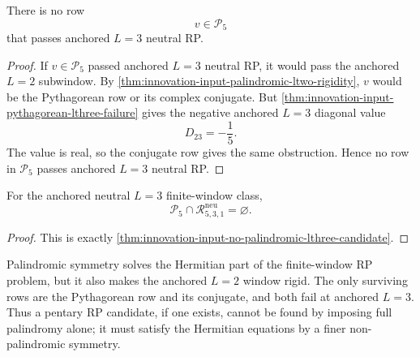 \begin{theorem}[No pentary palindromic anchored $L=3$ candidate]
\label{thm:innovation-input-no-palindromic-lthree-candidate}
There is no row
$$
v\in\mathcal P_5
$$
that passes anchored $L=3$ neutral RP.
\end{theorem}

\begin{proof}
If $v\in\mathcal P_5$ passed anchored $L=3$ neutral RP, it would pass the
anchored $L=2$ subwindow. By
\autoref{thm:innovation-input-palindromic-ltwo-rigidity}, $v$ would be the
Pythagorean row or its complex conjugate. But
\autoref{thm:innovation-input-pythagorean-lthree-failure} gives the
negative anchored $L=3$ diagonal value
$$
D_{23}=-\frac15.
$$
The value is real, so the conjugate row gives the same obstruction. Hence
no row in $\mathcal P_5$ passes anchored $L=3$ neutral RP.
\end{proof}

\begin{corollary}
\label{cor:innovation-input-palindromic-rp-exclusion}
For the anchored neutral $L=3$ finite-window class,
$$
\mathcal P_5\cap\mathcal R_{5,3,1}^{\mathrm{neu}}=\varnothing.
$$
\end{corollary}

\begin{proof}
This is exactly
\autoref{thm:innovation-input-no-palindromic-lthree-candidate}.
\end{proof}

\begin{principle}
\label{prin:innovation-input-palindromic-symmetry-window}
Palindromic symmetry solves the Hermitian part of the finite-window RP
problem, but it also makes the anchored $L=2$ window rigid. The only
surviving rows are the Pythagorean row and its conjugate, and both fail at
anchored $L=3$. Thus a pentary RP candidate, if one exists, cannot be
found by imposing full palindromy alone; it must satisfy the Hermitian
equations by a finer non-palindromic symmetry.
\end{principle}
